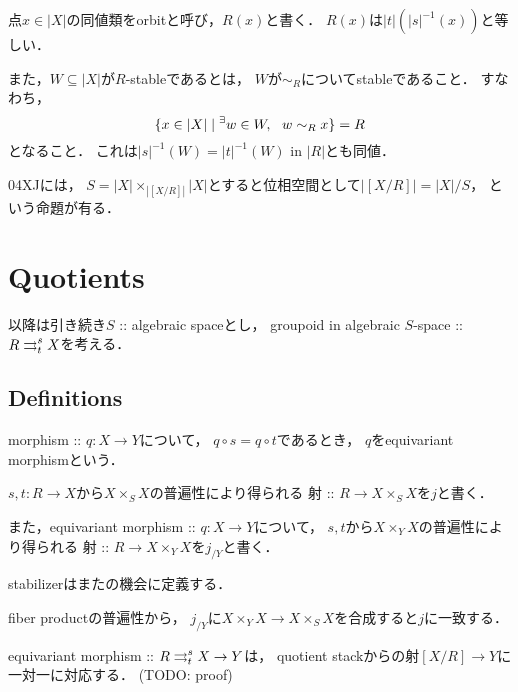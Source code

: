 \documentclass[a4paper, dvipdfmx]{jsarticle}
\begin{document}
\begin{Def}
    点$x \in |X|$の同値類をorbitと呼び，$R(x)$と書く．
    $R(x)$は$|t|(|s|^{-1}(x))$と等しい．

    また，$W \subseteq |X|$が$R$-stableであるとは，
    $W$が$\sim_{R}$についてstableであること．
    すなわち，
    \[ \{ x \in |X| \mid {}^{\exists} w \in W,~~ w \sim_R x \}=R \]
    となること．
    これは$|s|^{-1}(W)=|t|^{-1}(W)$ in $|R|$とも同値．
\end{Def}

\begin{Remark}
    \cite{SP} 04XJには，
    $S=|X| \times_{|[X/R]|} |X|$とすると位相空間として$|[X/R]|=|X|/S$，
    という命題が有る．
\end{Remark}

\section{Quotients}

以降は引き続き$S$ :: algebraic spaceとし，
groupoid in algebraic $S$-space :: $R \mathrel{\mathop{\rightrightarrows}^{s}_{t}} X$を考える．

\subsection{Definitions}
\begin{Def}
    morphism :: $q \colon X \to Y$について，
    $q \circ s=q \circ t$であるとき，
    $q$をequivariant morphismという．
\end{Def}

\begin{Def}[$j, j_{Y}$]
    $s,t \colon R \to X$から$X \times_{S} X$の普遍性により得られる
    射 :: $R \to X \times_{S} X$を$j$と書く．

    また，equivariant morphism :: $q \colon X \to Y$について，
    $s,t$から$X \times_{Y} X$の普遍性により得られる
    射 :: $R \to X \times_{Y} X$を$j_{/Y}$と書く．
\end{Def}

stabilizerはまたの機会に定義する．

\begin{Remark}
    fiber productの普遍性から，
    $j_{/Y}$に$X \times_{Y} X \to X \times_{S} X$を合成すると$j$に一致する．
\end{Remark}

\begin{Remark}
    equivariant morphism :: $R \mathrel{\mathop{\rightrightarrows}^{s}_{t}} X \to Y$は，
    quotient stackからの射$[X/R] \to Y$に一対一に対応する．
    (TODO: proof)
\end{Remark}
\end{document}
